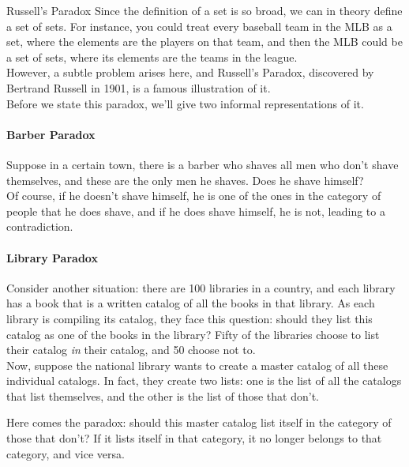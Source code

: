 \begin{proc}{Russell's Paradox}
Since the definition of a set is so broad, we can in theory define a set of sets.  For instance, you could treat every baseball team in the MLB as a set, where the elements are the players on that team, and then the MLB could be a set of sets, where its elements are the teams in the league.\\

However, a subtle problem arises here, and Russell's Paradox, discovered by Bertrand Russell in 1901, is a famous illustration of it.\\

Before we state this paradox, we'll give two informal representations of it.\\

\paragraph{Barber Paradox} Suppose in a certain town, there is a barber who shaves all men who don't shave themselves, and these are the only men he shaves.  Does he shave himself?\\

Of course, if he doesn't shave himself, he is one of the ones in the category of people that he does shave, and if he does shave himself, he is not, leading to a contradiction.\\

\paragraph{Library Paradox} Consider another situation: there are 100 libraries in a country, and each library has a book that is a written catalog of all the books in that library.  As each library is compiling its catalog, they face this question: should they list this catalog as one of the books in the library?  Fifty of the libraries choose to list their catalog \emph{in} their catalog, and 50 choose not to.\\

Now, suppose the national library wants to create a master catalog of all these individual catalogs.  In fact, they create two lists: one is the list of all the catalogs that list themselves, and the other is the list of those that don't.

Here comes the paradox: should this master catalog list itself in the category of those that don't?  If it lists itself in that category, it no longer belongs to that category, and vice versa.\\


\end{proc}
